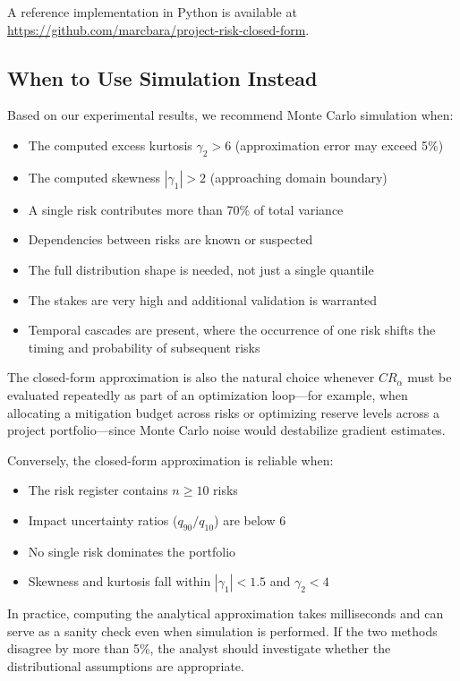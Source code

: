 \documentclass[12pt,a4paper]{article}
\theoremstyle{definition}
\theoremstyle{remark}
\begin{document}
A reference implementation in Python is available at \url{https://github.com/marcbara/project-risk-closed-form}.

\subsection{When to Use Simulation Instead}

Based on our experimental results, we recommend Monte Carlo simulation when:
\begin{itemize}
    \item The computed excess kurtosis $\gamma_2 > 6$ (approximation error may exceed 5\%)
    \item The computed skewness $|\gamma_1| > 2$ (approaching domain boundary)
    \item A single risk contributes more than 70\% of total variance
    \item Dependencies between risks are known or suspected
    \item The full distribution shape is needed, not just a single quantile
    \item The stakes are very high and additional validation is warranted
    \item Temporal cascades are present, where the occurrence of one risk shifts the timing and probability of subsequent risks \citep{Bara2025}
\end{itemize}

The closed-form approximation is also the natural choice whenever $CR_\alpha$ must be evaluated repeatedly as part of an optimization loop—for example, when allocating a mitigation budget across risks or optimizing reserve levels across a project portfolio—since Monte Carlo noise would destabilize gradient estimates.

Conversely, the closed-form approximation is reliable when:
\begin{itemize}
    \item The risk register contains $n \geq 10$ risks
    \item Impact uncertainty ratios ($q_{90}/q_{10}$) are below 6
    \item No single risk dominates the portfolio
    \item Skewness and kurtosis fall within $|\gamma_1| < 1.5$ and $\gamma_2 < 4$
\end{itemize}

In practice, computing the analytical approximation takes milliseconds and can serve as a sanity check even when simulation is performed. If the two methods disagree by more than 5\%, the analyst should investigate whether the distributional assumptions are appropriate.
\end{document}
